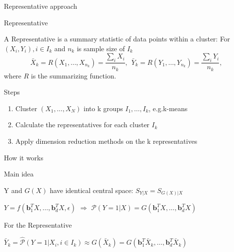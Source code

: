 \documentclass[ignorenonframetext,]{beamer}
\providecommand{\tightlist}{%
  \setlength{\itemsep}{0pt}\setlength{\parskip}{0pt}}
\begin{document}
\begin{frame}{Representative approach}

\begin{block}{Representative}

A Representative is a summary statistic of data points within a cluster:
For \((X_i, Y_i), i \in I_k\) and \(n_k\) is sample size of \(I_k\) \[
  \bar{X}_k = R(X_{1}, \dots, X_{n_k}) = \frac{\sum_i X_i}{n_k},~~ \bar{Y}_k = R(Y_{1}, \dots, Y_{n_k}) = \frac{\sum_i Y_i}{n_k},
\] where \(R\) is the summarizing function.

\end{block}

\begin{block}{Steps}

\begin{enumerate}
\def\labelenumi{\arabic{enumi}.}
\tightlist
\item
  Cluster \((X_1, \dots,X_N)\) into k groups \(I_1, \dots, I_k\),
  e.g.k-means
\item
  Calculate the representatives for each cluster \(I_k\)
\item
  Apply dimension reduction methods on the k representatives
\end{enumerate}

\end{block}

\end{frame}

\begin{frame}{How it works}

\begin{block}{Main idea}

Y and \(G(X)\) have identical central space: \(S_{Y|X} = S_{G(X)|X}\)

\begin{center}
$Y = f(\mathbf{b}_1^TX, \dots, \mathbf{b}_d^TX,\epsilon)$
$\Rightarrow$
$\mathcal{P}(Y = 1 |X) = G(\mathbf{b}_1^TX, \dots, \mathbf{b}_d^TX)$
\end{center}

\end{block}

\begin{block}{For the Representative}

\begin{center}
$\bar{Y}_k = \hat{\mathcal{P}}(Y = 1|X_i, i\in I_k) \approx  G(\bar{X}_k) = G(\mathbf{b}_1^T\bar{X}_k, \dots, \mathbf{b}_d^T\bar{X}_k)$
\end{center}

\end{block}

\end{frame}
\end{document}

